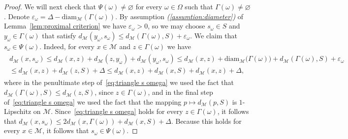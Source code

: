 \documentclass[11pt,reqno]{amsart}
\renewcommand{\le}{\leqslant}
\newcommand{\diam}{\mathrm{diam}}
\newcommand{\e}{\varepsilon}
\theoremstyle{remark}
\newcommand{\MM}{\mathcal{M}}
\renewcommand{\emptyset}{\varnothing}
\renewcommand{\1}{\mathbf 1}
\begin{document}
\begin{proof}
We will next check that $\Psi(\omega)\neq \emptyset$ for every $\omega\in \Omega$ such that $\Gamma(\omega)\neq \emptyset$. Denote $\e_\omega=\Delta-\diam_\MM(\Gamma(\omega))$. By assumption {\em (\ref{assumtion:diameter})} of Lemma~\ref{lem:proximal criterion} we have $\e_\omega>0$, so we may choose $s_\omega\in S$ and $y_\omega\in \Gamma(\omega)$  that satisfy $d_\MM(y_\omega,s_\omega)\le d_\MM(\Gamma(\omega),S)+\e_\omega$. We claim that $s_\omega\in \Psi(\omega)$. Indeed, for every $x\in \MM$ and $z\in \Gamma(\omega)$ we have
\begin{align}\label{eq:triangle s omega}
\begin{split}
d_\MM(x,s_\omega)\le d_\MM(x,z)+d_\MM(z,y_\omega)+ d_\MM(y_\omega,s_\omega)
\le d_\MM(x,z)+\diam_\MM\!\big(\Gamma(\omega)\big)+d_\MM(\Gamma(\omega),S)+\e_\omega\\\le d_\MM(x,z)+d_\MM(z,S)+\Delta\le d_\MM(x,z)+d_\MM(x,S)+d_\MM(x,z)+\Delta,
\end{split}
\end{align}
where in the penultimate step of~\eqref{eq:triangle s omega} we used the fact that $d_\MM(\Gamma(\omega),S)\le d_\MM(z,S)$, since $z\in \Gamma(\omega)$, and in the final step of~\eqref{eq:triangle s omega} we used the fact that the mapping $p\mapsto d_\MM(p,S)$ is $1$-Lipschitz on $\MM$. Since~\eqref{eq:triangle s omega} holds for every $z\in \Gamma(\omega)$, it follows that $d_\MM(x,s_\omega)\le 2d_\MM(x,\Gamma(\omega))+d_\MM(x,S)+\Delta$. Because this holds for every $x\in \MM$, it follows that $s_\omega\in \Psi(\omega)$.






\end{proof}
\end{document}
